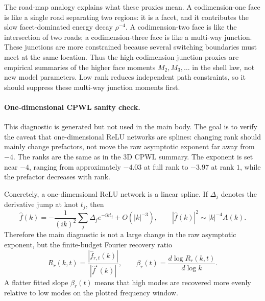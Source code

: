 The road-map analogy explains what these proxies mean. A codimension-one face is like a single road separating two regions: it is a facet, and it contributes the slow facet-dominated energy decay $\rho^{-4}$. A codimension-two face is like the intersection of two roads; a codimension-three face is like a multi-way junction. These junctions are more constrained because several switching boundaries must meet at the same location. Thus the high-codimension junction proxies are empirical summaries of the higher face moments $M_2,M_3,\ldots$ in the shell law, not new model parameters. Low rank reduces independent path constraints, so it should suppress these multi-way junction moments first.

\paragraph{One-dimensional CPWL sanity check.}
This diagnostic is generated but not used in the main body. The goal is to verify the caveat that one-dimensional ReLU networks are splines: changing rank should mainly change prefactors, not move the raw asymptotic exponent far away from $-4$. The ranks are the same as in the 3D CPWL summary. The exponent is set near $-4$, ranging from approximately $-4.03$ at full rank to $-3.97$ at rank $1$, while the prefactor decreases with rank.

Concretely, a one-dimensional ReLU network is a linear spline. If $\Delta_j$ denotes the derivative jump at knot $t_j$, then
\begin{equation}
\widehat f(k)=
-\frac{1}{(ik)^2}\sum_j \Delta_j e^{-ikt_j}
+O(|k|^{-3}),
\qquad
|\widehat f(k)|^2\sim |k|^{-4}A(k).
\end{equation}
Therefore the main diagnostic is not a large change in the raw asymptotic exponent, but the finite-budget Fourier recovery ratio
\begin{equation}
R_r(k,t)=\frac{|\widehat f_{r,t}(k)|}{|\widehat f^\star(k)|},
\qquad
\beta_r(t)=\frac{d\log R_r(k,t)}{d\log k}.
\label{eq:app-recovery}
\end{equation}
A flatter fitted slope $\beta_r(t)$ means that high modes are recovered more evenly relative to low modes on the plotted frequency window.

